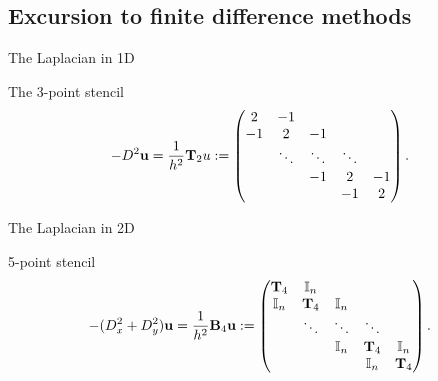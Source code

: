 \subsection{Excursion to finite difference methods}


\begin{frame}{The Laplacian in 1D}
  \begin{block}{The 3-point stencil}
    \begin{gather}
      -D^2 \mathbf u = \frac1{h^2} \mathbf T_2 u :=
      \begin{pmatrix}
        2 & -1 \\
        -1 & 2 & -1\\
        &\ddots & \ddots & \ddots \\
        &&-1 & 2 & -1\\
        &&& -1 & 2
      \end{pmatrix}.
    \end{gather}
  \end{block}
\end{frame}


\begin{frame}{The Laplacian in 2D}
  \begin{block}{5-point stencil}
      \begin{gather}
    -(D_x^2+D_y^2) \mathbf u = \frac1{h^2} \mathbf B_4 \mathbf u :=
    \begin{pmatrix}
      \mathbf T_4 & \mathbb I_n \\
      \mathbb I_n & \mathbf T_4 & \mathbb I_n \\
      &\ddots & \ddots & \ddots \\
      &&\mathbb I_n & \mathbf T_4 & \mathbb I_n \\
      &&&\mathbb I_n & \mathbf T_4 \\
    \end{pmatrix}.
  \end{gather}
  \end{block}
\end{frame}

